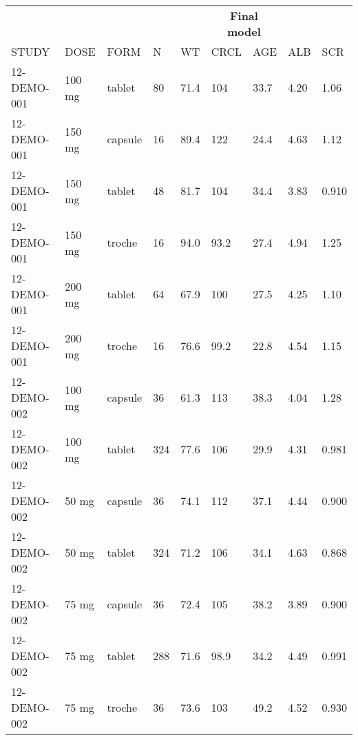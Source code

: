 \documentclass[
]{article}
\newenvironment{Shaded}{\begin{snugshade}}{\end{snugshade}}
\newcommand{\ControlFlowTok}[1]{\textcolor[rgb]{0.13,0.29,0.53}{\textbf{#1}}}
\newcommand{\DataTypeTok}[1]{\textcolor[rgb]{0.13,0.29,0.53}{#1}}
\newcommand{\KeywordTok}[1]{\textcolor[rgb]{0.13,0.29,0.53}{\textbf{#1}}}
\newcommand{\NormalTok}[1]{#1}
\newcommand{\OperatorTok}[1]{\textcolor[rgb]{0.81,0.36,0.00}{\textbf{#1}}}
\newcommand{\StringTok}[1]{\textcolor[rgb]{0.31,0.60,0.02}{#1}}
\begin{document}
\begin{table}[h]
\centering
{\def\arraystretch{1.4}\tabcolsep=5pt
\begin{threeparttable}
\begin{tabular}[h]{lllllllll}
\hline
\multicolumn{5}{c}{} & \multicolumn{2}{c}{\textbf{Final model}} & \multicolumn{2}{c}{}\\
\cmidrule(lr){6-7}
STUDY & DOSE & FORM & N & WT & CRCL & AGE & ALB & SCR \\
\hline
12-DEMO-001 & 100 mg & tablet & 80 & 71.4 & 104 & 33.7 & 4.20 & 1.06 \\
12-DEMO-001 & 150 mg & capsule & 16 & 89.4 & 122 & 24.4 & 4.63 & 1.12 \\
12-DEMO-001 & 150 mg & tablet & 48 & 81.7 & 104 & 34.4 & 3.83 & 0.910 \\
12-DEMO-001 & 150 mg & troche & 16 & 94.0 & 93.2 & 27.4 & 4.94 & 1.25 \\
12-DEMO-001 & 200 mg & tablet & 64 & 67.9 & 100 & 27.5 & 4.25 & 1.10 \\
12-DEMO-001 & 200 mg & troche & 16 & 76.6 & 99.2 & 22.8 & 4.54 & 1.15 \\
12-DEMO-002 & 100 mg & capsule & 36 & 61.3 & 113 & 38.3 & 4.04 & 1.28 \\
12-DEMO-002 & 100 mg & tablet & 324 & 77.6 & 106 & 29.9 & 4.31 & 0.981 \\
12-DEMO-002 & 50 mg & capsule & 36 & 74.1 & 112 & 37.1 & 4.44 & 0.900 \\
12-DEMO-002 & 50 mg & tablet & 324 & 71.2 & 106 & 34.1 & 4.63 & 0.868 \\
12-DEMO-002 & 75 mg & capsule & 36 & 72.4 & 105 & 38.2 & 3.89 & 0.900 \\
12-DEMO-002 & 75 mg & tablet & 288 & 71.6 & 98.9 & 34.2 & 4.49 & 0.991 \\
12-DEMO-002 & 75 mg & troche & 36 & 73.6 & 103 & 49.2 & 4.52 & 0.930 \\
\hline
\end{tabular}
\end{threeparttable}
}
\end{table}

\begin{Shaded}
\end{Shaded}
\end{document}
